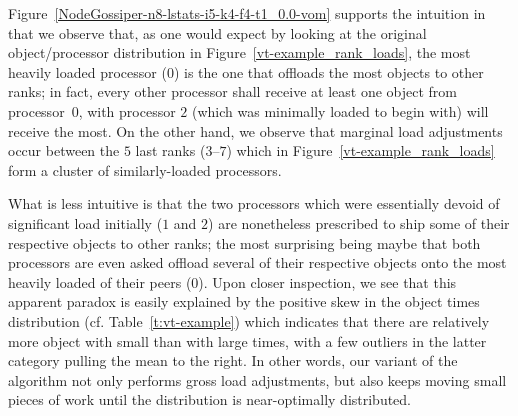 Figure~\ref{NodeGossiper-n8-lstats-i5-k4-f4-t1_0.0-vom} supports
the intuition in that we observe that, as one would expect by looking at
the original object/processor distribution in
Figure~\ref{vt-example_rank_loads}, the most heavily loaded processor
($0$) is the one that offloads the most objects to other ranks; in
fact, every other processor shall receive at least one object from
processor~$0$, with processor $2$ (which was minimally loaded to begin
with) will receive the most.
On the other hand, we observe that marginal load adjustments occur
between the $5$ last ranks ($3$--$7$) which in
Figure~\ref{vt-example_rank_loads} form a cluster of similarly-loaded
processors.

What is less intuitive is that the two processors which were
essentially devoid of significant load initially ($1$ and $2$) are
nonetheless prescribed to ship some of their respective objects to
other ranks; the most surprising being maybe that both processors are
even asked offload several of their respective objects onto the most
heavily loaded of their peers ($0$).
Upon closer inspection, we see that this apparent paradox is easily
explained by the positive skew in the object times distribution
(cf. Table~\ref{t:vt-example}) which indicates that there are
relatively more object with small than with large times, with a few
outliers in the latter category pulling the mean to the right.
In other words, our variant of the algorithm not only performs gross
load adjustments, but also keeps moving small pieces of work until the
distribution is near-optimally distributed.